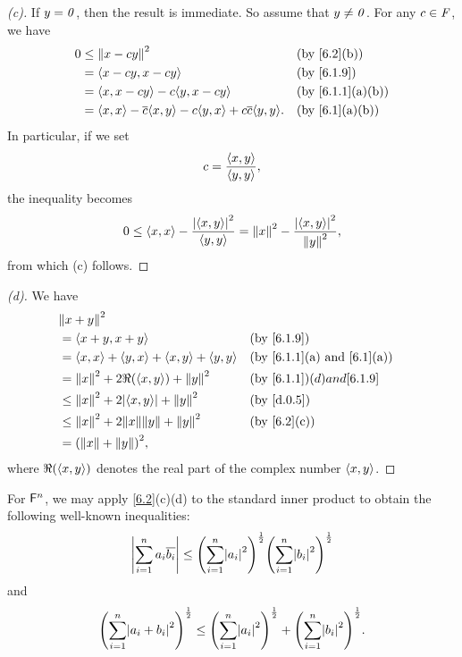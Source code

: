 \begin{proof}[(c)]
  If \(y = \mathit{0}\), then the result is immediate.
  So assume that \(y \neq \mathit{0}\).
  For any \(c \in \mathit{F}\), we have
  \begin{align*}
    0 & \leq \norm{x - cy}^2                                                       &  & \by{6.2}[b]     \\
      & = \inn{x - cy, x - cy}                                                     &  & \by{6.1.9}      \\
      & = \inn{x, x - cy} - c \inn{y, x - cy}                                      &  & \by{6.1.1}[a,b] \\
      & = \inn{x, x} - \conj{c} \inn{x, y} - c \inn{y, x} + c \conj{c} \inn{y, y}. &  & \by{6.1}[a,b]
  \end{align*}
  In particular, if we set
  \[
    c = \frac{\left\langle x, y\right\rangle}{\left\langle y, y\right\rangle},
  \]
  the inequality becomes
  \[
    0 \leq \left\langle x, x\right\rangle - \frac{\left\lvert\left\langle x, y\right\rangle\right\rvert^2}{\left\langle y, y\right\rangle} = \left\lVert x\right\rVert^2 - \frac{\left\lvert\left\langle x, y\right\rangle\right\rvert^2}{\left\lVert y\right\rVert^2},
  \]
  from which (c) follows.
\end{proof}

\begin{proof}[(d)]
  We have
  \begin{align*}
     & \norm{x + y}^2                                                                                         \\
     & = \inn{x + y, x + y}                                &  & \by{6.1.9}                                    \\
     & = \inn{x, x} + \inn{y, x} + \inn{x, y} + \inn{y, y} &  & \text{(by \cref{6.1.1}(a) and \cref{6.1}(a))} \\
     & = \norm{x}^2 + 2 \Re(\inn{x, y}) + \norm{y}^2       &  & \by{6.1.1}(d) and \cref{6.1.9}                \\
     & \leq \norm{x}^2 + 2 \abs{\inn{x, y}} + \norm{y}^2   &  & \by{d.0.5}                                    \\
     & \leq \norm{x}^2 + 2 \norm{x} \norm{y} + \norm{y}^2  &  & \by{6.2}[c]                                   \\
     & = \pa{\norm{x} + \norm{y}}^2,
  \end{align*}
  where \(\Re(\left\langle x, y\right\rangle)\) denotes the real part of the complex number \(\left\langle x, y\right\rangle\).
\end{proof}

\begin{eg}\label{6.1.11}
  For \(\mathsf{F}^n\), we may apply \cref{6.2}(c)(d) to the standard inner product to obtain the following well-known inequalities:
  \[
    \abs{\sum_{i = 1}^n a_i \conj{b_i}} \leq \pa{\sum_{i = 1}^n \abs{a_i}^2}^{\frac{1}{2}} \pa{\sum_{i = 1}^n \abs{b_i}^2}^{\frac{1}{2}}
  \]
  and
  \[
    \pa{\sum_{i = 1}^n \abs{a_i + b_i}^2}^{\frac{1}{2}} \leq \pa{\sum_{i = 1}^n \abs{a_i}^2}^{\frac{1}{2}} + \pa{\sum_{i = 1}^n \abs{b_i}^2}^{\frac{1}{2}}.
  \]
\end{eg}

